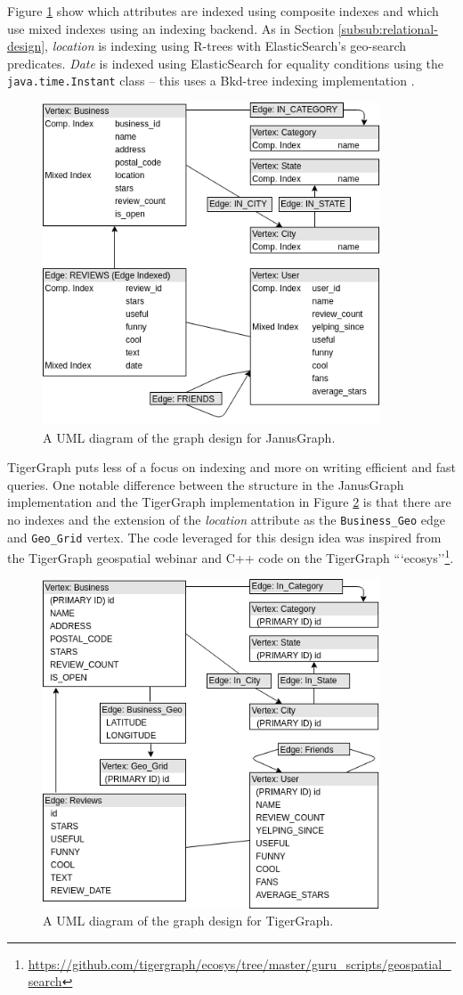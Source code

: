 Figure \ref{fig:janusgraph-design} show which attributes are indexed using composite indexes and which use mixed indexes using an indexing backend. As in Section \ref{subsub:relational-design}, \emph{location} is indexing using R-trees with ElasticSearch's geo-search predicates. \emph{Date} is indexed using ElasticSearch for equality conditions using the \texttt{java.time.Instant} class -- this uses a Bkd-tree indexing implementation \cite{es-bkdtree-index}.

\begin{figure}[h!]
    \centering
    \includegraphics[width=10cm]{img/janus-design.png}
    \caption{A UML diagram of the graph design for JanusGraph.}
    \label{fig:janusgraph-design}
\end{figure}

TigerGraph puts less of a focus on indexing and more on writing efficient and fast queries. One notable difference between the structure in the JanusGraph implementation and the TigerGraph implementation in Figure \ref{fig:tigergraph-design} is that there are no indexes and the extension of the \emph{location} attribute as the \texttt{Business\_Geo} edge and \texttt{Geo\_Grid} vertex. The code leveraged for this design idea was inspired from the TigerGraph geospatial webinar \cite{graphgurus} and C++ code on the TigerGraph ```ecosys''\footnote{\url{https://github.com/tigergraph/ecosys/tree/master/guru\_scripts/geospatial\_search}}.

\begin{figure}[h!]
    \centering
    \includegraphics[width=10cm]{img/tigergraph-design.png}
    \caption{A UML diagram of the graph design for TigerGraph.}
    \label{fig:tigergraph-design}
\end{figure}

